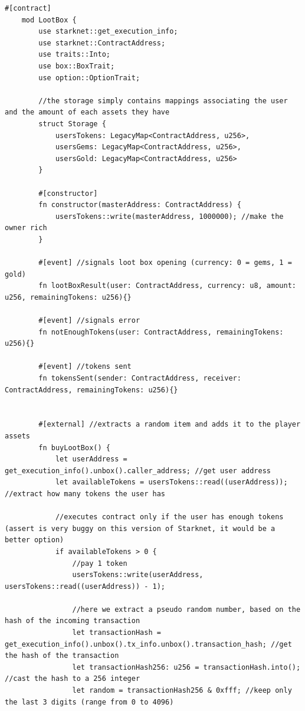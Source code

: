 \documentclass[12pt]{article}
\begin{document}
\begin{lstlisting}[language=cairo, caption={Loot box smart contract code. Can also be found at \url{https://github.com/Lapo9/Layer-2-Blockchains-for-Videogames/blob/master/LootBoxSmartContract/LootBoxSmartContract.cairo}.}, captionpos=b]
    #[contract]
    mod LootBox {
        use starknet::get_execution_info;
        use starknet::ContractAddress;
        use traits::Into;
        use box::BoxTrait;
        use option::OptionTrait;

        //the storage simply contains mappings associating the user and the amount of each assets they have
        struct Storage {
            usersTokens: LegacyMap<ContractAddress, u256>,
            usersGems: LegacyMap<ContractAddress, u256>,
            usersGold: LegacyMap<ContractAddress, u256>
        }

        #[constructor]
        fn constructor(masterAddress: ContractAddress) {
            usersTokens::write(masterAddress, 1000000); //make the owner rich
        }

        #[event] //signals loot box opening (currency: 0 = gems, 1 = gold)
        fn lootBoxResult(user: ContractAddress, currency: u8, amount: u256, remainingTokens: u256){}

        #[event] //signals error
        fn notEnoughTokens(user: ContractAddress, remainingTokens: u256){}

        #[event] //tokens sent
        fn tokensSent(sender: ContractAddress, receiver: ContractAddress, remainingTokens: u256){}
        

        #[external] //extracts a random item and adds it to the player assets
        fn buyLootBox() {
            let userAddress = get_execution_info().unbox().caller_address; //get user address
            let availableTokens = usersTokens::read((userAddress)); //extract how many tokens the user has

            //executes contract only if the user has enough tokens (assert is very buggy on this version of Starknet, it would be a better option)
            if availableTokens > 0 {
                //pay 1 token
                usersTokens::write(userAddress, usersTokens::read((userAddress)) - 1);

                //here we extract a pseudo random number, based on the hash of the incoming transaction
                let transactionHash = get_execution_info().unbox().tx_info.unbox().transaction_hash; //get the hash of the transaction
                let transactionHash256: u256 = transactionHash.into(); //cast the hash to a 256 integer
                let random = transactionHash256 & 0xfff; //keep only the last 3 digits (range from 0 to 4096)
                

\end{lstlisting}
\end{document}
